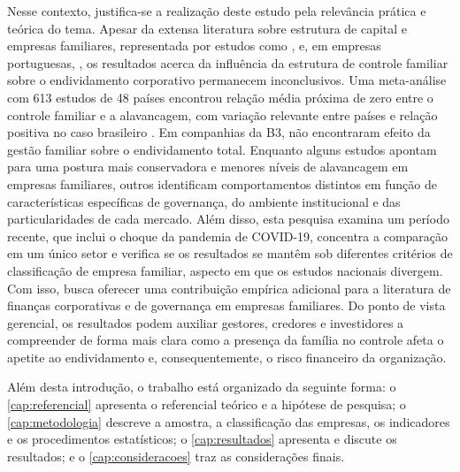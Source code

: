 Nesse contexto, justifica-se a realização deste estudo pela relevância prática e
teórica do tema. Apesar da extensa literatura sobre estrutura de capital e
empresas familiares, representada por estudos como ,
 e, em empresas portuguesas, , os
resultados acerca da
influência da estrutura de controle familiar sobre o endividamento corporativo
permanecem inconclusivos. Uma meta-análise com 613 estudos de 48 países encontrou
relação média próxima de zero entre o controle familiar e a alavancagem, com
variação relevante entre países e relação positiva no caso brasileiro
\cite{hansen2021}. Em companhias da B3,  não encontraram
efeito da gestão familiar sobre o endividamento total. Enquanto alguns estudos apontam para uma postura mais
conservadora e menores níveis de alavancagem em empresas familiares, outros
identificam comportamentos distintos em função de características específicas de
governança, do ambiente institucional e das particularidades de cada mercado. Além
disso, esta pesquisa examina um período recente, que inclui o choque da pandemia de
COVID-19, concentra a comparação em um único setor e verifica se os resultados se
mantêm sob diferentes critérios de classificação de empresa familiar, aspecto em
que os estudos nacionais divergem. Com isso, busca oferecer uma contribuição
empírica adicional para a literatura de finanças corporativas e de governança em
empresas familiares. Do ponto de vista gerencial, os resultados podem auxiliar
gestores, credores e investidores a compreender de forma mais clara como a
presença da família no controle afeta o apetite ao endividamento e,
consequentemente, o risco financeiro da organização.

Além desta introdução, o trabalho está organizado da seguinte forma: o
\autoref{cap:referencial} apresenta o referencial teórico e a hipótese de
pesquisa; o \autoref{cap:metodologia} descreve a amostra, a classificação das
empresas, os indicadores e os procedimentos estatísticos; o
\autoref{cap:resultados} apresenta e discute os resultados; e o
\autoref{cap:consideracoes} traz as considerações finais.
